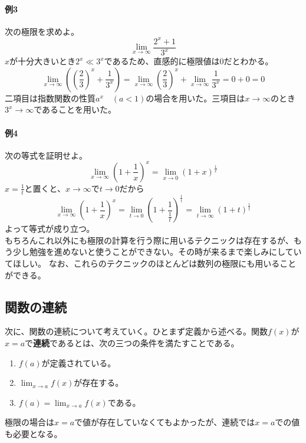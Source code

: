 \documentclass[a4j,dvipdfmx]{jsarticle}
\begin{document}
                \paragraph{例3}次の極限を求めよ。
                    \begin{equation*}
                        \lim_{x\to\infty}\frac{2^x+1}{3^x}
                    \end{equation*}
                    $x$が十分大きいとき$2^x\ll 3^x$であるため、直感的に極限値は0だとわかる。
                    \begin{equation*}
                        \lim_{x\to\infty}\left(\left(\frac{2}{3}\right)^x+\frac{1}{3^x}\right)=\lim_{x\to\infty}\left(\frac{2}{3}\right)^x+\lim_{x\to\infty}\frac{1}{3^x}=0+0=0
                    \end{equation*}
                    二項目は指数関数の性質$a^x\quad(a<1)$の場合を用いた。三項目は$x\to\infty$のとき$3^x\to\infty$であることを用いた。

                \paragraph{例4}次の等式を証明せよ。
                    \begin{equation*}
                        \lim_{x\to \infty}\left(1+\frac{1}{x}\right)^x = \lim_{x\to 0}\left(1+x\right)^\frac{1}{x} 
                    \end{equation*}
                    $x=\frac{1}{t}$と置くと、$x\to\infty$で$t\to0$だから
                    \begin{equation*}
                        \lim_{x\to \infty}\left(1+\frac{1}{x}\right)^x = \lim_{t\to 0}\left(1+\frac{1}{\frac{1}{t}}\right)^\frac{1}{t}=\lim_{t\to\infty}(1+t)^\frac{1}{t}
                    \end{equation*}
                    よって等式が成り立つ。\\

                もちろんこれ以外にも極限の計算を行う際に用いるテクニックは存在するが、もう少し勉強を進めないと使うことができない。その時が来るまで楽しみにしていてほしい。
                なお、これらのテクニックのほとんどは数列の極限にも用いることができる。
            \clearpage
            \subsection{関数の連続}
                次に、関数の連続について考えていく。ひとまず定義から述べる。関数$f(x)$が$x=a$で\textbf{連続}であるとは、次の三つの条件を満たすことである。
                \begin{enumerate}
                    \item $f(a)$が定義されている。
                    \item $\displaystyle\lim_{x\to a}f(x)$が存在する。
                    \item $\displaystyle f(a)=\lim_{x\to a}f(x)$である。
                \end{enumerate}
                極限の場合は$x=a$で値が存在していなくてもよかったが、連続では$x=a$での値も必要となる。
\end{document}
